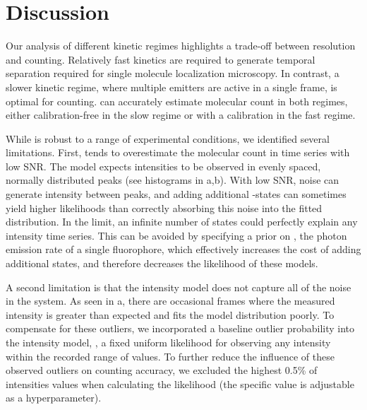 \section{Discussion} \label{discussion}

Our analysis of different kinetic regimes highlights a trade-off 
between resolution and counting.
  Relatively fast kinetics are required to generate temporal separation required for single 
  molecule localization microscopy.
  In contrast, a slower kinetic regime, where multiple emitters are active in a single frame, 
  is optimal for counting.
  \ours can accurately estimate molecular count in both regimes, either calibration-free in the slow regime 
  or with a calibration in the fast regime.

While \ours is robust to a range of experimental conditions, 
we identified several limitations.
  First, \ours tends to overestimate the molecular
  count in time series with low SNR.
  The model expects intensities to be observed in evenly spaced, normally
  distributed peaks (see histograms in a,b).
  With low SNR, noise can generate intensity between peaks, and adding additional 
  \z{}-states can sometimes yield higher likelihoods than correctly absorbing 
  this noise into the fitted distribution.
  In the limit, an infinite number of states could perfectly
  explain any intensity time series.
  This can be avoided by specifying a prior on \re, the photon
  emission rate of a single fluorophore, which effectively increases the cost
  of adding additional states, and therefore decreases the likelihood of these models.

A second limitation is that the intensity model does not capture all of the noise
in the system.
    As seen in a, there are occasional
    frames where the measured intensity is greater than expected and 
    fits the model distribution poorly.
    To compensate for these outliers, we incorporated a baseline outlier
    probability into the intensity model, \ie, a fixed uniform likelihood for
    observing any intensity within the recorded range of values.
    To further reduce the influence of these observed outliers on counting accuracy, we
    excluded the highest 0.5\% of intensities values when calculating the
    likelihood (the specific value is adjustable as a hyperparameter).

